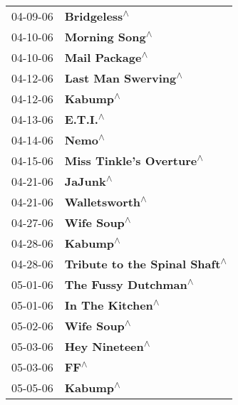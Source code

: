 \begin{supertabular}{p{0.25\columnwidth}p{0.75\columnwidth}}
 04-09-06 &                                      \textbf{Bridgeless\textsuperscript{$\wedge$}} \\
 04-10-06 &                                    \textbf{Morning Song\textsuperscript{$\wedge$}} \\
 04-10-06 &                                    \textbf{Mail Package\textsuperscript{$\wedge$}} \\
 04-12-06 &                               \textbf{Last Man Swerving\textsuperscript{$\wedge$}} \\
 04-12-06 &                                          \textbf{Kabump\textsuperscript{$\wedge$}} \\
 04-13-06 &                                          \textbf{E.T.I.\textsuperscript{$\wedge$}} \\
 04-14-06 &                                            \textbf{Nemo\textsuperscript{$\wedge$}} \\
 04-15-06 &                          \textbf{Miss Tinkle's Overture\textsuperscript{$\wedge$}} \\
 04-21-06 &                                          \textbf{JaJunk\textsuperscript{$\wedge$}} \\
 04-21-06 &                                    \textbf{Walletsworth\textsuperscript{$\wedge$}} \\
 04-27-06 &                                       \textbf{Wife Soup\textsuperscript{$\wedge$}} \\
 04-28-06 &                                          \textbf{Kabump\textsuperscript{$\wedge$}} \\
 04-28-06 &                     \textbf{Tribute to the Spinal Shaft\textsuperscript{$\wedge$}} \\
 05-01-06 &                              \textbf{The Fussy Dutchman\textsuperscript{$\wedge$}} \\
 05-01-06 &                                  \textbf{In The Kitchen\textsuperscript{$\wedge$}} \\
 05-02-06 &                                       \textbf{Wife Soup\textsuperscript{$\wedge$}} \\
 05-03-06 &                                    \textbf{Hey Nineteen\textsuperscript{$\wedge$}} \\
 05-03-06 &                                              \textbf{FF\textsuperscript{$\wedge$}} \\
 05-05-06 &                                          \textbf{Kabump\textsuperscript{$\wedge$}} \\

\end{supertabular}
